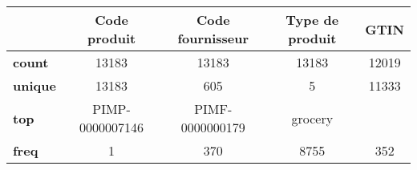 \begin{tabular}{lcccc}
\toprule
{} &     Code produit & Code fournisseur & Type de produit &   GTIN \\
\midrule
\textbf{count } &            13183 &            13183 &           13183 &  12019 \\
\textbf{unique} &            13183 &              605 &               5 &  11333 \\
\textbf{top   } &  PIMP-0000007146 &  PIMF-0000000179 &         grocery &        \\
\textbf{freq  } &                1 &              370 &            8755 &    352 \\
\bottomrule
\end{tabular}
